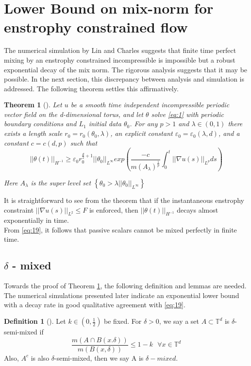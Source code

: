 \documentclass[12pt]{report}   %
\renewcommand{\leq}{\leqslant}
\renewcommand{\geq}{\geqslant}
\renewcommand{\epsilon}{\varepsilon}
\numberwithin{equation}{section}
\theoremstyle{plain}
\newtheorem{theorem}{Theorem}
\theoremstyle{definition}
\newtheorem{definition}[lemma]{Definition}
\theoremstyle{remark}
\begin{document}
 \section{Lower Bound on mix-norm for enstrophy constrained flow}
The  numerical simulation by Lin and Charles\cite{opt} suggests that finite time perfect mixing by an enstrophy constrained incompressible is impossible but a robust exponential decay of the mix norm. The rigorous analysis suggests that it may be possible. In the next section, this discrepancy  between analysis and simulation is addressed. The following theorem settles this affirmatively.\\
\begin{theorem}[{\cite[Theorem~1.1]{IyerKiselevEA14}}]\label{ensthm}
 Let $u$ be a smooth time independent incompressible periodic vector field on the d-dimensional torus, and let $\theta$ solve \eqref{eq:1} with periodic boundary conditions and $L_1$ initial data $\theta_0$.
 For any $p > 1$ and $\lambda\in (0, 1)$ there exists a length scale $r_0 = r_0(\theta_0, \lambda)$, an explicit constant $\epsilon_0 = \epsilon_0(\lambda, d)$, and a constant $c = c(d, p)$ such that  
\begin{equation}
||\theta(t)||_{H^{-1}} \geq \epsilon_0 r_0^{\frac{d}{2}+1}||\theta_0||_{L^\infty}exp\left(\frac{-c}{m(A_\lambda)^\frac{1}{p}} \int_0^t ||\nabla u(s) ||_{L^p} ds\right) \label{eq:19}
\end{equation}
 
 Here $A_\lambda$ is the super level set $\left\lbrace \theta_0 > \lambda||\theta_0||_{L^\infty}\right\rbrace$ \\
\end{theorem}

 It is straightforward to see from the theorem that if the instantaneous enstrophy constraint $||\nabla u(s)||_{L^2} \leq F$ is enforced, then $||\theta(t)||_{H^{-1}}$ decays almost exponentially in time. \\
 From \eqref{eq:19}, it follows that passive scalars cannot be mixed perfectly in finite time. 
 

\subsection{ $\delta$ - mixed}
 Towards the proof of Theorem \ref{ensthm}, the following definition and lemmas are needed. \\
  The numerical simulations presented later indicate an exponential lower bound with a decay rate in good qualitative agreement with \eqref{eq:19}.
\begin{definition}[{\cite[Definition~2.1]{IyerKiselevEA14}}]\label{defdelta}
 Let $k\in(0, \frac{1}{2})$ be fixed. For $\delta >0$, we say a set $A \subset\mathbb{T}^d$ is $\delta$-semi-mixed if 
 \begin{equation}
 \frac{m(A\cap B(x.\delta))}{m(B(x, \delta))} \leq 1-k ~~~\forall x\in \mathbb{T}^d
 \end{equation}
 Also, $A^c$ is also $\delta$-semi-mixed, then we say A is \underline{$\delta-mixed$}. 
\end{definition}
 
\end{document}
